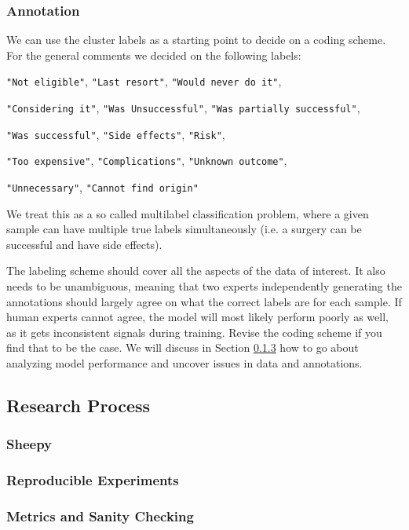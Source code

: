 \subsubsection{Annotation}
We can use the cluster labels as a starting point to decide on a coding scheme. For the general comments we decided on the following labels:
\begin{displayquote}
    \texttt{"Not eligible"},
    \texttt{"Last resort"},
    \texttt{"Would never do it"},

    \texttt{"Considering it"},
    \texttt{"Was Unsuccessful"},
    \texttt{"Was partially successful"},

    \texttt{"Was successful"},
    \texttt{"Side effects"},
    \texttt{"Risk"},

    \texttt{"Too expensive"},
    \texttt{"Complications"},
    \texttt{"Unknown outcome"},

    \texttt{"Unnecessary"},
    \texttt{"Cannot find origin"}
\end{displayquote}
We treat this as a so called multilabel classification problem, where a given sample can have multiple true labels simultaneously (i.e. a surgery can be successful and have side effects).

The labeling scheme should cover all the aspects of the data of interest.
It also needs to be unambiguous, meaning that two experts independently generating the annotations should largely agree on what the correct labels are for each sample.
If human experts cannot agree, the model will most likely perform poorly as well, as it gets inconsistent signals during training.
Revise the coding scheme if you find that to be the case.
We will discuss in Section \ref{metrics_and_sanity_checking} how to go about analyzing model performance and uncover issues in data and annotations.

\subsection{Research Process}
\subsubsection{Sheepy}
\subsubsection{Reproducible Experiments}
\subsubsection{Metrics and Sanity Checking}
\label{metrics_and_sanity_checking}
